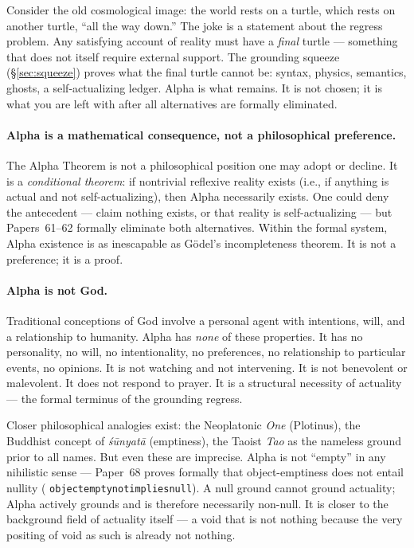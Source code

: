 \documentclass[11pt]{article}
\theoremstyle{remark}
\newcommand{\lean}[1]{%
  \penalty-100
  \begingroup\def\_{\textunderscore\allowbreak}\texttt{#1}\endgroup}
\begin{document}
\begin{tcolorbox}[colback=green!8,colframe=green!50!black,
  title={The Final Turtle}]
Consider the old cosmological image: the world rests on a turtle, which rests on
another turtle, ``all the way down.'' The joke is a statement about the regress
problem. Any satisfying account of reality must have a \emph{final} turtle ---
something that does not itself require external support. The grounding squeeze
(\S\ref{sec:squeeze}) proves what the final turtle cannot be: syntax, physics,
semantics, ghosts, a self-actualizing ledger. Alpha is what remains. It is not
chosen; it is what you are left with after all alternatives are formally eliminated.
\end{tcolorbox}

\paragraph{Alpha is a mathematical consequence, not a philosophical preference.}
The Alpha Theorem is not a philosophical position one may adopt or decline. It is a
\emph{conditional theorem}: if nontrivial reflexive reality exists (i.e., if anything
is actual and not self-actualizing), then Alpha necessarily exists. One could deny the
antecedent --- claim nothing exists, or that reality is self-actualizing --- but
Papers~61--62 formally eliminate both alternatives. Within the formal system, Alpha
existence is as inescapable as G\"{o}del's incompleteness theorem. It is not a
preference; it is a proof.

\paragraph{Alpha is not God.}
Traditional conceptions of God involve a personal agent with intentions, will, and a
relationship to humanity. Alpha has \emph{none} of these properties. It has no
personality, no will, no intentionality, no preferences, no relationship to particular
events, no opinions. It is not watching and not intervening. It is not benevolent or
malevolent. It does not respond to prayer. It is a structural necessity of actuality
--- the formal terminus of the grounding regress.

Closer philosophical analogies exist: the Neoplatonic \emph{One} (Plotinus), the
Buddhist concept of \emph{śūnyatā} (emptiness), the Taoist \emph{Tao} as the nameless
ground prior to all names. But even these are imprecise. Alpha is not ``empty'' in any
nihilistic sense --- Paper~68 proves formally that object-emptiness does not entail
nullity (\lean{object\_empty\_not\allowbreak\_implies\_null}). A null ground cannot ground actuality; Alpha
actively grounds and is therefore necessarily non-null. It is closer to the background
field of actuality itself --- a void that is not nothing because the very positing of
void as such is already not nothing.
\end{document}
